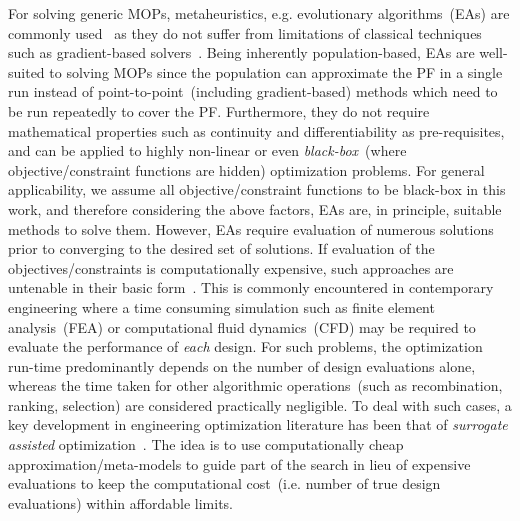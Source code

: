 \documentclass[twocolumn,10pt]{asme2ej}
\begin{document}
For solving generic MOPs, metaheuristics, e.g. evolutionary algorithms~(EAs) are commonly used~\cite{deb2001multi} as they do not suffer from limitations of classical techniques such as gradient-based solvers~\cite{KHTwangreview2007}. Being inherently population-based, EAs are well-suited to solving MOPs since the population can approximate the PF in a single run instead of point-to-point~(including gradient-based) methods which need to be run repeatedly to cover the PF. Furthermore, they do not require mathematical properties such as continuity and differentiability as pre-requisites, and can be applied to highly non-linear or even \emph{black-box}~(where objective/constraint functions are hidden) optimization problems. For general applicability, we assume all objective/constraint functions to be black-box in this work, and therefore considering the above factors, EAs are, in principle, suitable methods to solve them. However, EAs require evaluation of numerous solutions prior to converging to the desired set of solutions. If evaluation of the objectives/constraints is computationally expensive, such approaches are untenable  in their basic form~\cite{KHTjmd2016,KHTjin2005csf}. This is commonly encountered in contemporary engineering where a time consuming simulation such as finite element analysis~(FEA) or computational fluid dynamics~(CFD) may be required to evaluate the performance of \emph{each} design. For such problems, the optimization run-time predominantly depends on the number of design evaluations alone, whereas the time taken for other algorithmic operations~(such as recombination, ranking, selection) are considered practically negligible. To deal with such cases, a key development in engineering optimization literature has been that of \textit{surrogate assisted} optimization~\cite{KHTwangreview2007,KHTjinswarm2011}. The idea is to use computationally cheap approximation/meta-models to guide part of the search in lieu of expensive evaluations to keep the computational cost~(i.e. number of true design evaluations) within affordable limits. 
\end{document}
